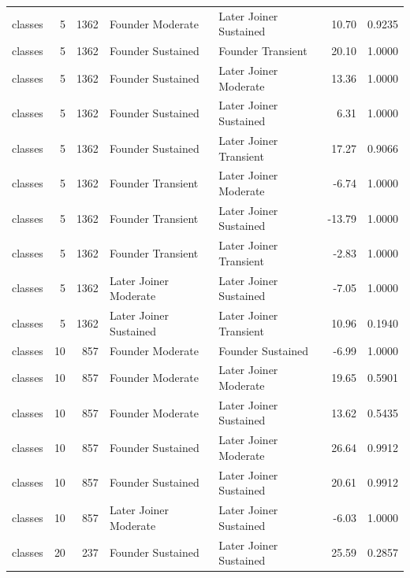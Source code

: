 \begin{table}[H]
{\begin{tabular}{l r r l l r r}
classes & 5 & 1362 & Founder Moderate & Later Joiner Sustained & 10.70 & 0.9235 \\ 
classes & 5 & 1362 & Founder Sustained & Founder Transient & 20.10 & 1.0000 \\ 
classes & 5 & 1362 & Founder Sustained & Later Joiner Moderate & 13.36 & 1.0000 \\ 
classes & 5 & 1362 & Founder Sustained & Later Joiner Sustained & 6.31 & 1.0000 \\ 
classes & 5 & 1362 & Founder Sustained & Later Joiner Transient & 17.27 & 0.9066 \\ 
classes & 5 & 1362 & Founder Transient & Later Joiner Moderate & -6.74 & 1.0000 \\ 
classes & 5 & 1362 & Founder Transient & Later Joiner Sustained & -13.79 & 1.0000 \\ 
classes & 5 & 1362 & Founder Transient & Later Joiner Transient & -2.83 & 1.0000 \\ 
classes & 5 & 1362 & Later Joiner Moderate & Later Joiner Sustained & -7.05 & 1.0000 \\ 
classes & 5 & 1362 & Later Joiner Sustained & Later Joiner Transient & 10.96 & 0.1940 \\ 
classes & 10 & 857 & Founder Moderate & Founder Sustained & -6.99 & 1.0000 \\ 
classes & 10 & 857 & Founder Moderate & Later Joiner Moderate & 19.65 & 0.5901 \\ 
classes & 10 & 857 & Founder Moderate & Later Joiner Sustained & 13.62 & 0.5435 \\ 
classes & 10 & 857 & Founder Sustained & Later Joiner Moderate & 26.64 & 0.9912 \\ 
classes & 10 & 857 & Founder Sustained & Later Joiner Sustained & 20.61 & 0.9912 \\ 
classes & 10 & 857 & Later Joiner Moderate & Later Joiner Sustained & -6.03 & 1.0000 \\ 
classes & 20 & 237 & Founder Sustained & Later Joiner Sustained & 25.59 & 0.2857 \\ 
\bottomrule
\end{tabular}%
} 
\end{table}
\newpage 
